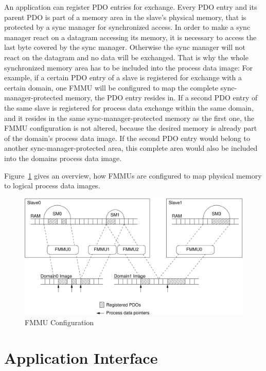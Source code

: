 \documentclass[a4paper,12pt,BCOR6mm,bibtotoc,idxtotoc]{scrbook}
\begin{document}
An application can register PDO entries for exchange. Every PDO entry and its
parent PDO is part of a memory area in the slave's physical memory, that is
protected by a sync manager \cite[sec.~6.7]{dlspec} for synchronized access.
In order to make a sync manager react on a datagram accessing its memory, it
is necessary to access the last byte covered by the sync manager. Otherwise
the sync manager will not react on the datagram and no data will be exchanged.
That is why the whole synchronized memory area has to be included into the
process data image: For example, if a certain PDO entry of a slave is
registered for exchange with a certain domain, one FMMU will be configured to
map the complete sync-manager-protected memory, the PDO entry resides in. If a
second PDO entry of the same slave is registered for process data exchange
within the same domain, and it resides in the same sync-manager-protected
memory as the first one, the FMMU configuration is not altered, because the
desired memory is already part of the domain's process data image. If the
second PDO entry would belong to another sync-manager-protected area, this
complete area would also be included into the domains process data image.

Figure~\ref{fig:fmmus} gives an overview, how FMMUs are configured to map
physical memory to logical process data images.

\begin{figure}[htbp]
  \centering
  \includegraphics[width=\textwidth]{images/fmmus}
  \caption{FMMU Configuration}
  \label{fig:fmmus}
\end{figure}


\chapter{Application Interface}
\label{chap:api}
\end{document}
